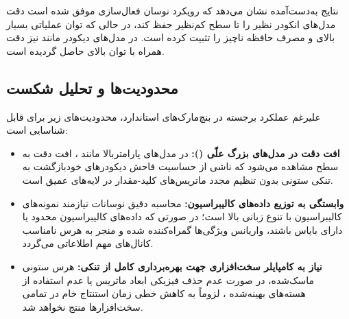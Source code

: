 نتایج به‌دست‌آمده نشان می‌دهد که رویکرد نوسان فعال‌سازی موفق شده است دقت مدل‌های انکودر نظیر  را تا سطح کم‌نظیر  حفظ کند، در حالی که توان عملیاتی بسیار بالای  و مصرف حافظه ناچیز  را تثبیت کرده است. در مدل‌های دیکودر مانند  نیز دقت  همراه با توان بالای  حاصل گردیده است.

\subsection{محدودیت‌ها و تحلیل شکست}
علیرغم عملکرد برجسته در بنچ‌مارک‌های استاندارد، محدودیت‌های زیر برای  قابل شناسایی است:
\begin{itemize}
    \item \textbf{افت دقت در مدل‌های بزرگ علّی ():} در مدل‌های پارامتربالا مانند ، افت دقت به سطح  مشاهده می‌شود که ناشی از حساسیت فاحش دیکودرهای خودبازگشت به تنکی ستونی بدون تنظیم مجدد ماتریس‌های کلید-مقدار در لایه‌های عمیق است.
    \item \textbf{وابستگی به توزیع داده‌های کالیبراسیون:} محاسبه دقیق نوسانات نیازمند نمونه‌های کالیبراسیون با تنوع زبانی بالا است؛ در صورتی که داده‌های کالیبراسیون محدود یا دارای بایاس باشند، واریانس ویژگی‌ها گمراه‌کننده شده و منجر به هرس نامناسب کانال‌های مهم اطلاعاتی می‌گردد.
    \item \textbf{نیاز به کامپایلر سخت‌افزاری جهت بهره‌برداری کامل از تنکی:} هرس ستونی ماسک‌شده، در صورت عدم حذف فیزیکی ابعاد ماتریس یا عدم استفاده از هسته‌های بهینه‌شده ، لزوماً به کاهش خطی زمان استنتاج خام در تمامی سخت‌افزارها منتج نخواهد شد.
\end{itemize}
